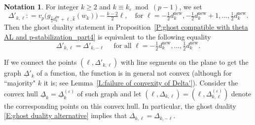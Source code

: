 \documentclass[12pt]{amsart}
\newcommand{\liang}[1]{{\color{blue} \sf $\clubsuit\clubsuit\clubsuit$ Liang: [#1]}}
\theoremstyle{definition}
\newtheorem{remark}[subsection]{Remark}
\newtheorem{notation}[subsection]{Notation}
\numberwithin{equation}{subsection}
\def\ZZ{\mathbb{Z}}
\newcommand{\new}{\mathrm{new}}
\newcommand{\Iw}{\mathrm{Iw}}
\begin{document}
\begin{notation}
\label{N:Delta kell}
For integer $k \geq 2$ and $k \equiv k_\varepsilon \bmod{(p-1)}$, we set
\begin{equation}
\label{E:definition of Delta'}
\Delta'_{k, \ell} : = v_p \big(g_{\frac 12 d_{k}^\Iw+\ell, \hat k}(w_k) \big) -\tfrac{k-2}2 \ell, \quad \textrm{for }\ell = -\tfrac 12 d_{k}^\new, -\tfrac 12 d_{k}^\new+1, \dots, \tfrac 12d_{k}^{\new}.
\end{equation}
Then the ghost duality statement in Proposition~\ref{P:ghost compatible with theta AL and p-stabilization_part4} is equivalent to the following
equality
\begin{equation}
\label{E:ghost duality alternative}
\Delta'_{k,\ell} = \Delta'_{{k}, -\ell} \quad\textrm{ for all }\ell = -\tfrac 12 d_{k}^\new, \dots, \tfrac 12d_{k}^{\new}.
\end{equation}

If we connect the points $(\ell, \Delta'_{k,\ell})$ with line segments on the plane to get the graph $\underline \Delta'_k$ of a function, the function is in general not convex (although for ``majority" $k$ it is; see Lemma~\ref{L:failure of convexity of Delta'}). Consider the convex hull $\underline \Delta_k = \underline \Delta^{(\varepsilon)}_k$ of such graph and let $(\ell, \Delta_{k, \ell}) = (\ell, \Delta^{(\varepsilon)}_{k, \ell})$ denote the corresponding points on this convex hull. In particular, the ghost duality \eqref{E:ghost duality alternative} implies that $\Delta_{k,\ell} = \Delta_{k, -\ell}$.

\end{notation}

\end{document}
